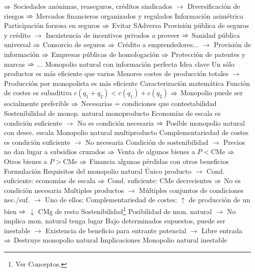 \documentclass{nuevotema}
\begin{document}
\begin{esquemal}
				\4[] $\Rightarrow$ Sociedades anónimas, reaseguros, créditos sindicados
				\4[] $\to$ Diversificación de riesgos
				\4[] $\Rightarrow$ Mercados financieros organizados y regulados
				\4 Información asimétrica
				\4[] Participación forzosa en seguros 
				\4[] $\Rightarrow$ Evitar SAdversa
				\4[] Provisión pública de seguros y crédito
				\4[] $\to$ Inexistencia de incentivos privados a proveer
				\4[] $\Rightarrow$ Sanidad pública universal
				\4[] $\Rightarrow$ Consorcio de seguros
				\4[] $\Rightarrow$ Crédito a emprendedores...
				\4[] $\to$ Provisión de información 
				\4[] $\Rightarrow$ Empresas públicas de homologación
				\4[] $\Rightarrow$ Protección de patentes y marcas
				\4[] $\Rightarrow$ ...
		\2 Monopolio natural con información perfecta
			\3 Idea clave
				\4 Un sólo productor es más eficiente que varios
				\4[] Menores costes de producción totales
				\4[] $\to$ Producción por monopolista es más eficiente
				\4 Caracterización matemática
				\4[] Función de costes es subaditiva
				\4[] $c(q_1 + q_2) < c(q_1) + c(q_2)$
				\4[] $\Rightarrow$ Monopolio puede ser socialmente preferible
				\4[] $\Rightarrow$ Necesarias = condiciones que contestabilidad
				\4 Sostenibilidad de monop. natural monoproducto
				\4[] Economías de escala es condición suficiente
				\4[] $\to$ No es condición necesaria
				\4[] $\Rightarrow$ Posible monopolio natural con desec. escala
				\4 Monopolio natural multiproducto
				\4[] Complementariedad de costes es condición suficiente
				\4[] $\to$ No necesaria
				\4[] Condición de sostenibilidad
				\4[] $\to$ Precios no dan lugar a subsidios cruzados
				\4[] $\Rightarrow$ Venta de algunos bienes a $P<\text{CMe}$
				\4[] $\Rightarrow$ Otros bienes a $P>\text{CMe}$
				\4[] $\Rightarrow$ Financia algunas pérdidas con otros beneficios
			\3 Formulación
				\4 Requisitos del monopolio natural
				\4[] Único producto
				\4[] $\to$ Cond. suficiente: economías de escala
				\4[] $\Rightarrow$ Cond. suficiente: CMe decrecientes
				\4[] $\Rightarrow$ No es condición necesaria
				\4[] 
				\4[] Multiples productos
				\4[] $\to$ Múltiples conjuntos de condiciones nec./suf.
				\4[] $\to$ Uno de ellos:
				\4[] Complementariedad de costes:
				\4[] $\uparrow$ de producción de un bien $\Rightarrow$ $\downarrow$ CMg de resto
				\4 Sostenibilidad\footnote{Ver Conceptos.}
				\4[] Posibilidad de mon. natural
				\4[] $\to$ No implica mon. natural tenga lugar
				\4[] Bajo determinados supuestos, puede ser inestable
				\4[] $\to$ Existencia de beneficio para entrante potencial
				\4[] $\to$ Libre entrada
				\4[] $\Rightarrow$ Destruye monopolio natural
			\3 Implicaciones
				\4 Monopolio natural inestable

\end{esquemal}
\end{document}

